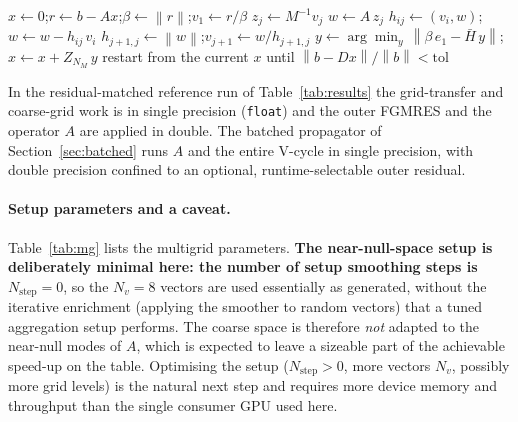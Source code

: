 \documentclass[12pt,a4paper]{article}
\newcommand{\Ddw}{D}
\newcommand{\Aop}{A}
\newcommand{\norm}[1]{\left\lVert #1 \right\rVert}
\begin{document}
\begin{algorithm}[H]
\caption{$\mathrm{FGMRES}(\Aop,b,M^{-1})$ with restart length $N_M=30$: flexible
GMRES whose preconditioner $M^{-1}$ is the two-grid V-cycle (Alg.~\ref{alg:vcycle})
and is allowed to vary between steps. Returns $x\approx\Aop^{-1}b=\Ddw^{-1}b$.}
\label{alg:fgmres}
\begin{algorithmic}[1]
\State $x \gets 0$;\quad $r \gets b-\Aop x$;\quad $\beta\gets\norm{r}$;\quad $v_1\gets r/\beta$
  \State $z_j \gets M^{-1} v_j$ 
  \State $w \gets \Aop\,z_j$
   
    \State $h_{ij}\gets(v_i,w)$;\quad $w\gets w-h_{ij}\,v_i$
  \EndFor
  \State $h_{j+1,j}\gets\norm{w}$;\quad $v_{j+1}\gets w/h_{j+1,j}$
\EndFor
\State $y\gets\arg\min_{y}\,\norm{\beta\,e_1-\bar H\,y}$;\quad $x\gets x + Z_{N_M}\,y$ 
\State restart from the current $x$ until $\norm{b-\Ddw x}/\norm{b}<\text{tol}$
\end{algorithmic}
\end{algorithm}

\noindent In the residual-matched reference run of Table~\ref{tab:results} the
grid-transfer and coarse-grid work is in single precision (\texttt{float}) and the
outer FGMRES and the operator $\Aop$ are applied in double. The batched propagator
of Section~\ref{sec:batched} runs $\Aop$ and the entire V-cycle in single
precision, with double precision confined to an optional, runtime-selectable outer
residual.

\paragraph{Setup parameters and a caveat.}
Table~\ref{tab:mg} lists the multigrid parameters. \textbf{The near-null-space
setup is deliberately minimal here: the number of setup smoothing steps is
$N_{\mathrm{step}}=0$}, so the $N_v=8$ vectors are used essentially as generated,
without the iterative enrichment (applying the smoother to random vectors) that a
tuned aggregation setup performs. The coarse space is therefore \emph{not}
adapted to the near-null modes of $\Aop$, which is expected to leave a sizeable
part of the achievable speed-up on the table. Optimising the setup
($N_{\mathrm{step}}>0$, more vectors $N_v$, possibly more grid levels) is the
natural next step and requires more device memory and throughput than the single
consumer GPU used here.
\end{document}
